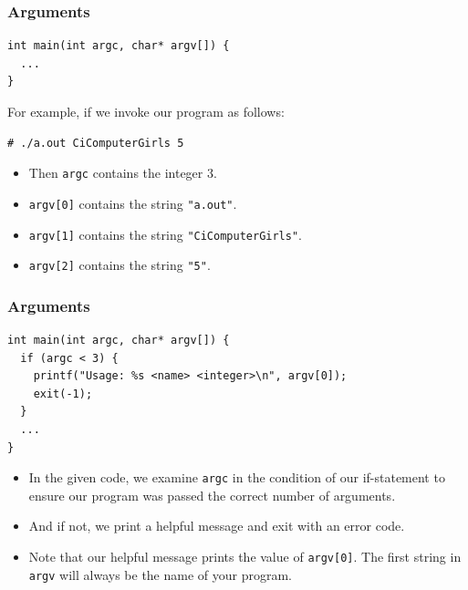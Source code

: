 \documentclass[pdf]{beamer}
\begin{document}
\begin{frame}[fragile]
  \frametitle{Arguments}
\begin{verbatim}
int main(int argc, char* argv[]) {
  ...
}
\end{verbatim}

  \bigskip

  For example, if we invoke our program as follows:
\begin{verbatim}
# ./a.out CiComputerGirls 5
\end{verbatim}

  \pause

  \bigskip

  \begin{itemize}
  \item Then \texttt{argc} contains the integer 3.
    \pause
  \item \texttt{argv[0]} contains the string \texttt{"a.out"}.
    \pause
  \item \texttt{argv[1]} contains the string \texttt{"CiComputerGirls"}.
    \pause
  \item \texttt{argv[2]} contains the string \texttt{"5"}.
  \end{itemize}

\end{frame}

\begin{frame}[fragile]
  \frametitle{Arguments}

\begin{verbatim}
int main(int argc, char* argv[]) {
  if (argc < 3) {
    printf("Usage: %s <name> <integer>\n", argv[0]);
    exit(-1);
  }
  ...
}
\end{verbatim}

  \begin{itemize}
  \item In the given code, we examine \texttt{argc} in the condition of
    our if-statement to ensure our program was passed the correct number of
    arguments.
    \pause
  \item And if not, we print a helpful message and exit with an error code.
    \pause
  \item Note that our helpful message prints the value of
    \texttt{argv[0]}. The first string in \texttt{argv} will always
    be the name of your program.
  \end{itemize}

\end{frame}
\end{document}
